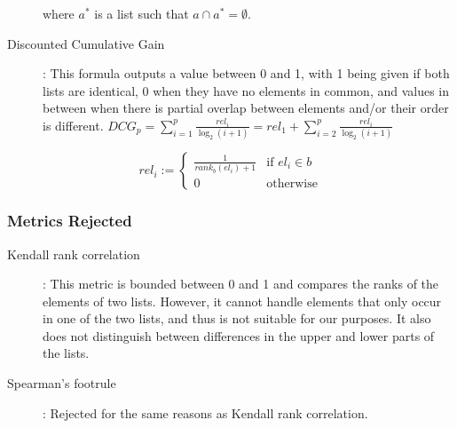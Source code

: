 \begin{description}
	      where \(a^{*}\) is a list such that \(a \cap a^{*} = \emptyset\).

	\item [Discounted Cumulative Gain]:
	      This formula outputs a value between 0 and 1, with 1 being given if both lists are identical, 0 when they have no elements in common, and values in between when there is partial overlap between elements and/or their order is different.
	      ${DCG_{p}} =\sum _{i=1}^{p}{\frac {rel_{i}}{\log _{2}(i+1)}}=rel_{1}+\sum _{i=2}^{p}{\frac {rel_{i}}{\log _{2}(i+1)}}$
\end{description}

\[
	rel_{i} :=
	\begin{cases}
		\frac{1}{rank_{b}(el_{i}) + 1} & \text{if } el_{i} \in b \\
		0                              & \text{otherwise}
	\end{cases}
\]
\subsubsection{Metrics Rejected}
\begin{description}
	\item [Kendall rank correlation ] \cite{kendallNEWMEASURERANK1938b}: This metric is bounded between 0 and 1 and compares the ranks of the elements of two lists. However, it cannot handle elements that only occur in one of the two lists, and thus is not suitable for our purposes. It also does not distinguish between differences in the upper and lower parts of the lists.
	\item [Spearman's footrule] \cite{spearmanCorrelationCalculatedFaulty1910}: Rejected for the same reasons as Kendall rank correlation.
\end{description}



